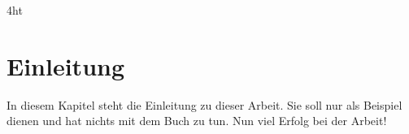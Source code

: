 \documentclass[
  a4paper,  %
  twoside,  %
  bibliography=totoc,
  headsepline,
  cleardoublepage=empty,
  parskip=half,
  draft=false
]{scrbook}
\begin{document}
\listoffigures
\listoftables

\ifdeutsch
\else
\fi

\ifdeutsch
\else
\fi

\printnoidxglossaries

\iftex4ht
\else
\fi



\renewcommand*{\chapterpagestyle}{scrplain}
\pagestyle{scrheadings}
\pagestyle{scrheadings}
\ihead[]{}
\chead[]{}
\ohead[]{\headmark}
\cfoot[]{}
\ifoot[]{}

































%
%


\chapter{Einleitung}
In diesem Kapitel steht die Einleitung zu dieser Arbeit.
Sie soll nur als Beispiel dienen und hat nichts mit dem Buch \cite{WSPA} zu tun.
Nun viel Erfolg bei der Arbeit!
\end{document}
